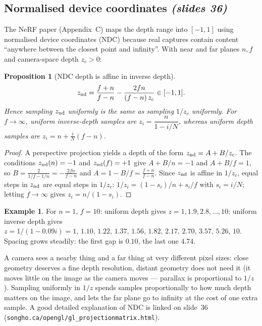 \documentclass[11pt,a4paper]{article}
\newcommand{\sref}[1]{\texorpdfstring{\emph{(slides #1)}}{(slides #1)}}
\theoremstyle{definition}
\newtheorem{example}{Example}[section]
\theoremstyle{plain}
\newtheorem{proposition}{Proposition}[section]
\begin{document}
\subsection{Normalised device coordinates \sref{36}}

The NeRF paper (Appendix~C) maps the depth range into $[-1,1]$ using normalised device coordinates (NDC) because real captures contain content ``anywhere between the closest point and infinity''. With near and far planes $n,f$ and camera-space depth $z_c>0$:

\begin{proposition}[NDC depth is affine in inverse depth]\label{prop:ndc}
\[
z_{\rm nd}=\frac{f+n}{f-n}-\frac{2fn}{(f-n)\,z_c}\in[-1,1].
\]
Hence sampling $z_{\rm nd}$ uniformly is the same as sampling $1/z_c$ uniformly. For $f\to\infty$, uniform inverse-depth samples are $z_i=\dfrac{n}{1-i/N}$, whereas uniform depth samples are $z_i=n+\frac iN(f-n)$.
\end{proposition}
\begin{proof}
A perspective projection yields a depth of the form $z_{\rm nd}=A+B/z_c$. The conditions $z_{\rm nd}(n)=-1$ and $z_{\rm nd}(f)=+1$ give $A+B/n=-1$ and $A+B/f=1$, so $B=\frac{2}{1/f-1/n}=-\frac{2fn}{f-n}$ and $A=1-B/f=\frac{f+n}{f-n}$. Since $z_{\rm nd}$ is affine in $1/z_c$, equal steps in $z_{\rm nd}$ are equal steps in $1/z_c$: $1/z_i=(1-s_i)/n+s_i/f$ with $s_i=i/N$; letting $f\to\infty$ gives $z_i=n/(1-s_i)$.
\end{proof}

\begin{example}
For $n=1$, $f=10$: uniform depth gives $z=1,1.9,2.8,\dots,10$; uniform inverse depth gives $z=1/(1-0.09i)=1,\,1.10,\,1.22,\,1.37,\,1.56,\,1.82,\,2.17,\,2.70,\,3.57,\,5.26,\,10$. Spacing grows steadily: the first gap is $0.10$, the last one $4.74$.
\end{example}

\begin{intuition}
A camera sees a nearby thing and a far thing at very different pixel sizes: close geometry deserves a fine depth resolution, distant geometry does not need it (it moves little on the image as the camera moves --- parallax is proportional to $1/z$). Sampling uniformly in $1/z$ spends samples proportionally to how much depth matters on the image, and lets the far plane go to infinity at the cost of one extra sample. A good detailed explanation of NDC is linked on slide~36 (\texttt{songho.ca/opengl/gl\_projectionmatrix.html}).
\end{intuition}
\end{document}

